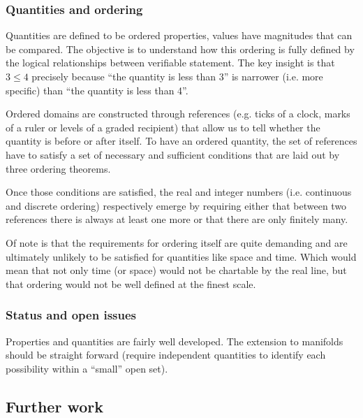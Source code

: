 \documentclass[twocolumn]{article}
\begin{document}
\subsubsection{Quantities and ordering}

Quantities are defined to be ordered properties, values have magnitudes that can be compared. The objective is to understand how this ordering is fully defined by the logical relationships between verifiable statement. The key insight is that $3 \leq 4$ precisely because ``the quantity is less than 3'' is narrower (i.e. more specific) than ``the quantity is less than 4''.

Ordered domains are constructed through references (e.g. ticks of a clock, marks of a ruler or levels of a graded recipient) that allow us to tell whether the quantity is before or after itself. To have an ordered quantity, the set of references have to satisfy a set of necessary and sufficient conditions that are laid out by three ordering theorems. 

Once those conditions are satisfied, the real and integer numbers (i.e. continuous and discrete ordering) respectively emerge by requiring either that between two references there is always at least one more or that there are only finitely many.

Of note is that the requirements for ordering itself are quite demanding and are ultimately unlikely to be satisfied for quantities like space and time. Which would mean that not only time (or space) would not be chartable by the real line, but that ordering would not be well defined at the finest scale.

\subsubsection{Status and open issues}

Properties and quantities are fairly well developed. The extension to manifolds should be straight forward (require independent quantities to identify each possibility within a ``small'' open set).

\subsection{Further work}
\end{document}
